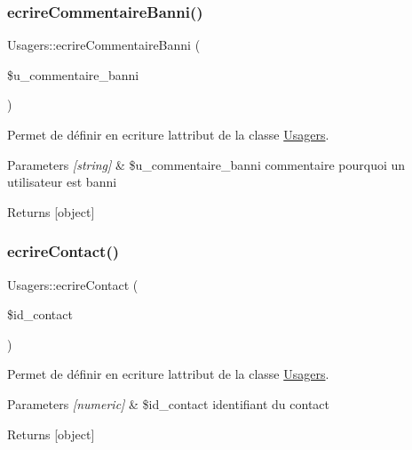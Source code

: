 \subsubsection{\texorpdfstring{ecrire\+Commentaire\+Banni()}{ecrireCommentaireBanni()}}
{\footnotesize\ttfamily Usagers\+::ecrire\+Commentaire\+Banni (\begin{DoxyParamCaption}\item[{}]{\$u\+\_\+commentaire\+\_\+banni }\end{DoxyParamCaption})}



Permet de définir en ecriture l\textquotesingle{}attribut de la classe \hyperlink{class_usagers}{Usagers}. 


\begin{DoxyParams}{Parameters}
{\em \mbox{[}string\mbox{]}} & \$u\+\_\+commentaire\+\_\+banni commentaire pourquoi un utilisateur est banni \\
\hline
\end{DoxyParams}
\begin{DoxyReturn}{Returns}
\mbox{[}object\mbox{]} 
\end{DoxyReturn}
\mbox{\label{class_usagers_ab25ab2f1ed9e4668d562422a1fa19ae8}} 
\subsubsection{\texorpdfstring{ecrire\+Contact()}{ecrireContact()}}
{\footnotesize\ttfamily Usagers\+::ecrire\+Contact (\begin{DoxyParamCaption}\item[{}]{\$id\+\_\+contact }\end{DoxyParamCaption})}



Permet de définir en ecriture l\textquotesingle{}attribut de la classe \hyperlink{class_usagers}{Usagers}. 


\begin{DoxyParams}{Parameters}
{\em \mbox{[}numeric\mbox{]}} & \$id\+\_\+contact identifiant du contact \\
\hline
\end{DoxyParams}
\begin{DoxyReturn}{Returns}
\mbox{[}object\mbox{]} 
\end{DoxyReturn}
\mbox{\label{class_usagers_ab93fa770c19fb41fe6fc22cf43bf2d8a}} 

